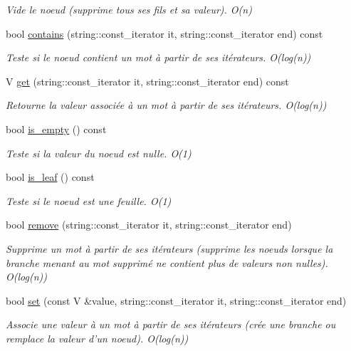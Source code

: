 \begin{DoxyCompactItemize}
\begin{DoxyCompactList}\small\item\em Vide le noeud (supprime tous ses fils et sa valeur). O(n) \end{DoxyCompactList}\item 
bool \hyperlink{classnode_adefd963bddc63c4abf8ccc60956593b3}{contains} (string\-::const\-\_\-iterator it, string\-::const\-\_\-iterator end) const 
\begin{DoxyCompactList}\small\item\em Teste si le noeud contient un mot à partir de ses itérateurs. O(log(n)) \end{DoxyCompactList}\item 
V \hyperlink{classnode_a57c31fd12a5467742fca7add4fb9c5b3}{get} (string\-::const\-\_\-iterator it, string\-::const\-\_\-iterator end) const 
\begin{DoxyCompactList}\small\item\em Retourne la valeur associée à un mot à partir de ses itérateurs. O(log(n)) \end{DoxyCompactList}\item 
bool \hyperlink{classnode_a76557d16ab200a15bde4005ab4824f8b}{is\-\_\-empty} () const 
\begin{DoxyCompactList}\small\item\em Teste si la valeur du noeud est nulle. O(1) \end{DoxyCompactList}\item 
bool \hyperlink{classnode_a7976286a801a47dd55e3376deca9f15c}{is\-\_\-leaf} () const 
\begin{DoxyCompactList}\small\item\em Teste si le noeud est une feuille. O(1) \end{DoxyCompactList}\item 
bool \hyperlink{classnode_adcb06ab0301a218ba40112e3c85c01e7}{remove} (string\-::const\-\_\-iterator it, string\-::const\-\_\-iterator end)
\begin{DoxyCompactList}\small\item\em Supprime un mot à partir de ses itérateurs (supprime les noeuds lorsque la branche menant au mot supprimé ne contient plus de valeurs non nulles). O(log(n)) \end{DoxyCompactList}\item 
bool \hyperlink{classnode_a0ad2f39812483d50cf7c5273882d3fd0}{set} (const V \&value, string\-::const\-\_\-iterator it, string\-::const\-\_\-iterator end)
\begin{DoxyCompactList}\small\item\em Associe une valeur à un mot à partir de ses itérateurs (crée une branche ou remplace la valeur d'un noeud). O(log(n)) \end{DoxyCompactList}\item 

\end{DoxyCompactItemize}

